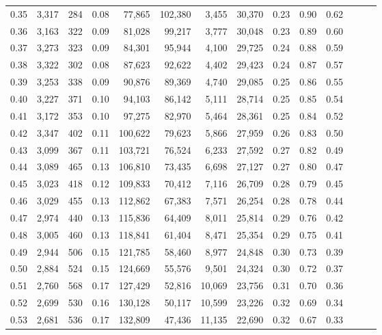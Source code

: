 \begin{tabular}{rrrrrrrrrrrrrr}
0.35 &  3,317 &  284 &  0.08 &   77,865 &  102,380 &   3,455 &  30,370 &  0.23 &  0.90 &      0.62 \\
0.36 &  3,163 &  322 &  0.09 &   81,028 &   99,217 &   3,777 &  30,048 &  0.23 &  0.89 &      0.60 \\
0.37 &  3,273 &  323 &  0.09 &   84,301 &   95,944 &   4,100 &  29,725 &  0.24 &  0.88 &      0.59 \\
0.38 &  3,322 &  302 &  0.08 &   87,623 &   92,622 &   4,402 &  29,423 &  0.24 &  0.87 &      0.57 \\
0.39 &  3,253 &  338 &  0.09 &   90,876 &   89,369 &   4,740 &  29,085 &  0.25 &  0.86 &      0.55 \\
0.40 &  3,227 &  371 &  0.10 &   94,103 &   86,142 &   5,111 &  28,714 &  0.25 &  0.85 &      0.54 \\
0.41 &  3,172 &  353 &  0.10 &   97,275 &   82,970 &   5,464 &  28,361 &  0.25 &  0.84 &      0.52 \\
0.42 &  3,347 &  402 &  0.11 &  100,622 &   79,623 &   5,866 &  27,959 &  0.26 &  0.83 &      0.50 \\
0.43 &  3,099 &  367 &  0.11 &  103,721 &   76,524 &   6,233 &  27,592 &  0.27 &  0.82 &      0.49 \\
0.44 &  3,089 &  465 &  0.13 &  106,810 &   73,435 &   6,698 &  27,127 &  0.27 &  0.80 &      0.47 \\
0.45 &  3,023 &  418 &  0.12 &  109,833 &   70,412 &   7,116 &  26,709 &  0.28 &  0.79 &      0.45 \\
0.46 &  3,029 &  455 &  0.13 &  112,862 &   67,383 &   7,571 &  26,254 &  0.28 &  0.78 &      0.44 \\
0.47 &  2,974 &  440 &  0.13 &  115,836 &   64,409 &   8,011 &  25,814 &  0.29 &  0.76 &      0.42 \\
0.48 &  3,005 &  460 &  0.13 &  118,841 &   61,404 &   8,471 &  25,354 &  0.29 &  0.75 &      0.41 \\
0.49 &  2,944 &  506 &  0.15 &  121,785 &   58,460 &   8,977 &  24,848 &  0.30 &  0.73 &      0.39 \\
0.50 &  2,884 &  524 &  0.15 &  124,669 &   55,576 &   9,501 &  24,324 &  0.30 &  0.72 &      0.37 \\
0.51 &  2,760 &  568 &  0.17 &  127,429 &   52,816 &  10,069 &  23,756 &  0.31 &  0.70 &      0.36 \\
0.52 &  2,699 &  530 &  0.16 &  130,128 &   50,117 &  10,599 &  23,226 &  0.32 &  0.69 &      0.34 \\
0.53 &  2,681 &  536 &  0.17 &  132,809 &   47,436 &  11,135 &  22,690 &  0.32 &  0.67 &      0.33 \\

\end{tabular}
